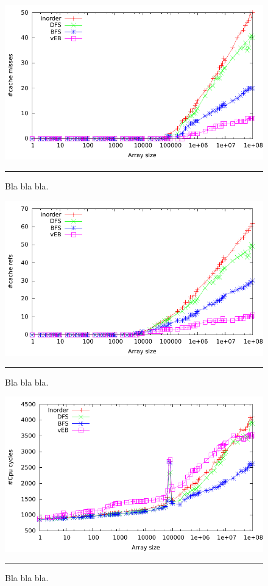 \begin{figure}[htbp]
	\centering
		\includegraphics[width=\textwidth]{./Figures/Project1/Cache_misses.pdf}
		\rule{35em}{0.5pt}
	\caption[Cache misses]{
	Bla bla bla.
	}
	\label{fig:Cache_misses}
\end{figure}



\begin{figure}[htbp]
	\centering
		\includegraphics[width=\textwidth]{./Figures/Project1/Cache_refs.pdf}
		\rule{35em}{0.5pt}
	\caption[Cache refs]{
	Bla bla bla.
	}
	\label{fig:Cache_refs}
\end{figure}



\begin{figure}[htbp]
	\centering
		\includegraphics[width=\textwidth]{./Figures/Project1/Cpu_cycles.pdf}
		\rule{35em}{0.5pt}
	\caption[CPU cycles]{
	Bla bla bla.
	}
	\label{fig:Cpu_cycles}
\end{figure}


